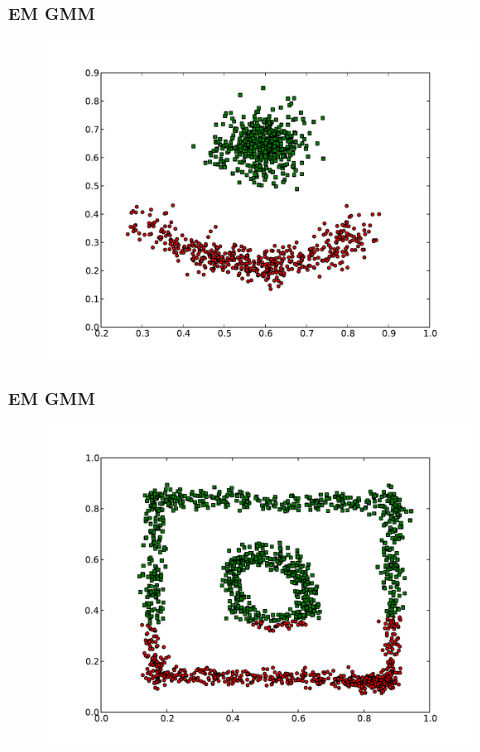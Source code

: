 \documentclass{beamer}
\begin{document}
\begin{frame}
\frametitle{EM GMM}
    \begin{figure}[]
    \includegraphics[scale=0.5]{GMM_red-blue-clusters.pdf}
    \end{figure}
\end{frame}

\begin{frame}
\frametitle{EM GMM}
    \begin{figure}[]
    \includegraphics[scale=0.5]{GMM_circle-weird.pdf}
    \end{figure}
\end{frame}
\end{document}
